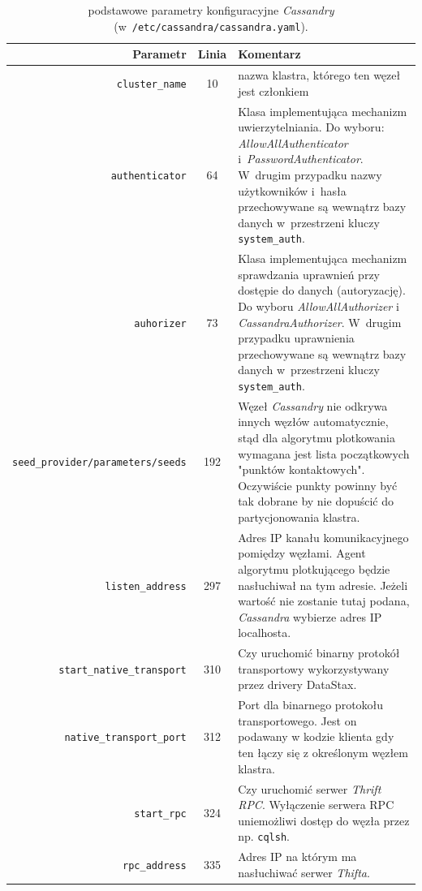 \documentclass{article} %
\begin{document}
\begin{table}[ht]
\caption{podstawowe parametry konfiguracyjne \emph{Cassandry} (w~\texttt{/etc/cassandra/cassandra.yaml}).}
\begin{tabular}{|r|c|p{7.5cm}|}
\hline 
\textbf{Parametr} & \textbf{Linia} & \textbf{Komentarz}\\
\hline
\hline
\texttt{cluster\_name} & 10 & nazwa klastra, którego ten węzeł jest członkiem\\
\hline
\texttt{authenticator} & 64 & Klasa implementująca mechanizm uwierzytelniania. Do wyboru: \emph{AllowAllAuthenticator} i~\emph{PasswordAuthenticator}. W~drugim przypadku nazwy użytkowników i~hasła przechowywane są wewnątrz bazy danych w~przestrzeni kluczy \texttt{system\_auth}.\\
\hline
\texttt{auhorizer} & 73 & Klasa implementująca mechanizm sprawdzania uprawnień przy dostępie do danych (autoryzację). Do wyboru \emph{AllowAllAuthorizer} i \emph{CassandraAuthorizer}. W~drugim przypadku uprawnienia przechowywane są wewnątrz bazy danych w~przestrzeni kluczy \texttt{system\_auth}.\\
\hline
\texttt{seed\_provider/parameters/seeds} & 192 & Węzeł \emph{Cassandry} nie odkrywa innych węzłów automatycznie, stąd dla algorytmu plotkowania wymagana jest lista początkowych "punktów kontaktowych". Oczywiście punkty powinny być tak dobrane by nie dopuścić do partycjonowania klastra.\\
\hline
\texttt{listen\_address} & 297 & Adres IP kanału komunikacyjnego pomiędzy węzłami. Agent algorytmu plotkującego będzie nasłuchiwał na tym adresie. Jeżeli wartość nie zostanie tutaj podana, \emph{Cassandra} wybierze adres IP localhosta.\\
\hline
\texttt{start\_native\_transport} & 310 & Czy uruchomić binarny protokół transportowy wykorzystywany przez drivery DataStax.\\
\hline
\texttt{native\_transport\_port} & 312 & Port dla binarnego protokołu transportowego. Jest on podawany w kodzie klienta gdy ten łączy się z określonym węzłem klastra.\\
\hline
\texttt{start\_rpc} & 324 & Czy uruchomić serwer \emph{Thrift RPC}. Wyłączenie serwera RPC uniemożliwi dostęp do węzła przez np. \texttt{cqlsh}.\\
\hline
\texttt{rpc\_address} & 335 & Adres IP na którym ma nasłuchiwać serwer \emph{Thifta}.\\
\hline
\end{tabular} 
\label{tab:config_options}
\end{table}
\end{document}
